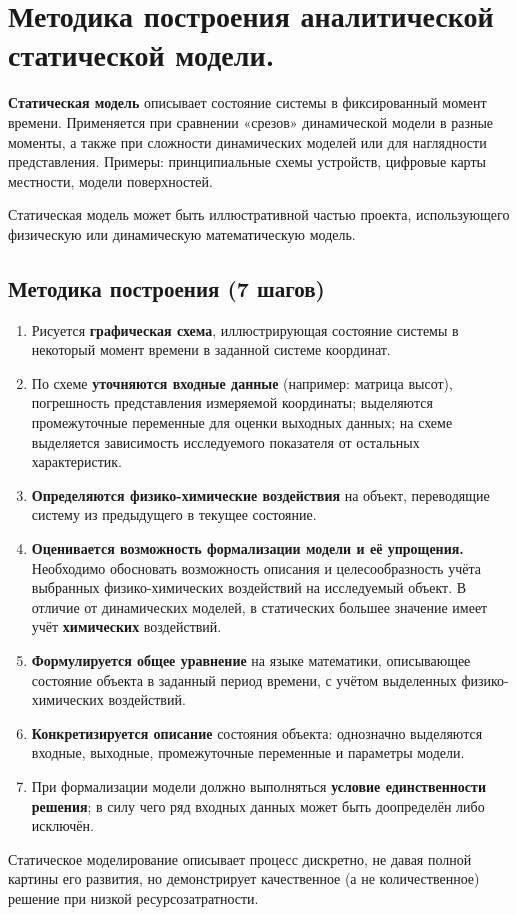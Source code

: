 \section{Методика построения аналитической статической модели.}

\textbf{Статическая модель} описывает состояние системы в фиксированный момент времени. Применяется при сравнении «срезов» динамической модели в разные моменты, а также при сложности динамических моделей или для наглядности представления. Примеры: принципиальные схемы устройств, цифровые карты местности, модели поверхностей.

Статическая модель может быть иллюстративной частью проекта, использующего физическую или динамическую математическую модель.

\subsection*{Методика построения (7 шагов)}

\begin{enumerate}
  \item Рисуется \textbf{графическая схема}, иллюстрирующая состояние системы в некоторый момент времени в заданной системе координат.

  \item По схеме \textbf{уточняются входные данные} (например: матрица высот), погрешность представления измеряемой координаты; выделяются промежуточные переменные для оценки выходных данных; на схеме выделяется зависимость исследуемого показателя от остальных характеристик.

  \item \textbf{Определяются физико-химические воздействия} на объект, переводящие систему из предыдущего в текущее состояние.

  \item \textbf{Оценивается возможность формализации модели и её упрощения.} Необходимо обосновать возможность описания и целесообразность учёта выбранных физико-химических воздействий на исследуемый объект. В отличие от динамических моделей, в статических большее значение имеет учёт \textbf{химических} воздействий.

  \item \textbf{Формулируется общее уравнение} на языке математики, описывающее состояние объекта в заданный период времени, с учётом выделенных физико-химических воздействий.

  \item \textbf{Конкретизируется описание} состояния объекта: однозначно выделяются входные, выходные, промежуточные переменные и параметры модели.

  \item При формализации модели должно выполняться \textbf{условие единственности решения}; в силу чего ряд входных данных может быть доопределён либо исключён.
\end{enumerate}

Статическое моделирование описывает процесс дискретно, не давая полной картины его развития, но демонстрирует качественное (а не количественное) решение при низкой ресурсозатратности.

\clearpage
